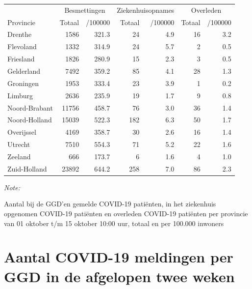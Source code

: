 \documentclass[
  english,
  man,floatsintext]{apa6}
\begin{document}
\begin{table}[H]
\centering
\begin{threeparttable}
\begin{tabular}{lrrrrrr}
\toprule
\multicolumn{1}{c}{ } & \multicolumn{2}{c}{Besmettingen} & \multicolumn{2}{c}{Ziekenhuisopnames} & \multicolumn{2}{c}{Overleden} \\
\cmidrule(l{3pt}r{3pt}){2-3} \cmidrule(l{3pt}r{3pt}){4-5} \cmidrule(l{3pt}r{3pt}){6-7}
Provincie & Totaal & /100000 & Totaal & /100000 & Totaal & /100000\\
\midrule
Drenthe & 1586 & 321.3 & 24 & 4.9 & 16 & 3.2\\
Flevoland & 1332 & 314.9 & 24 & 5.7 & 2 & 0.5\\
Friesland & 1826 & 280.9 & 15 & 2.3 & 3 & 0.5\\
Gelderland & 7492 & 359.2 & 85 & 4.1 & 28 & 1.3\\
Groningen & 1953 & 333.4 & 23 & 3.9 & 1 & 0.2\\
Limburg & 2636 & 235.9 & 19 & 1.7 & 9 & 0.8\\
Noord-Brabant & 11756 & 458.7 & 76 & 3.0 & 36 & 1.4\\
Noord-Holland & 15039 & 522.3 & 182 & 6.3 & 50 & 1.7\\
Overijssel & 4169 & 358.7 & 30 & 2.6 & 16 & 1.4\\
Utrecht & 7510 & 554.3 & 71 & 5.2 & 22 & 1.6\\
Zeeland & 666 & 173.7 & 6 & 1.6 & 4 & 1.0\\
Zuid-Holland & 23892 & 644.2 & 258 & 7.0 & 86 & 2.3\\
\bottomrule
\end{tabular}
\begin{tablenotes}
\item \textit{Note: } 
\item Aantal bij de GGD’en gemelde COVID-19 patiënten, in het ziekenhuis opgenomen COVID-19 patiënten en overleden COVID-19 patiënten per provincie van 01 oktober t/m 15 oktober 10:00 uur, totaal en per 100.000 inwoners
\end{tablenotes}
\end{threeparttable}
\end{table}

\newpage

\hypertarget{aantal-covid-19-meldingen-per-ggd-in-de-afgelopen-twee-weken}{%
\section{Aantal COVID-19 meldingen per GGD in de afgelopen twee weken}\label{aantal-covid-19-meldingen-per-ggd-in-de-afgelopen-twee-weken}}
\end{document}
